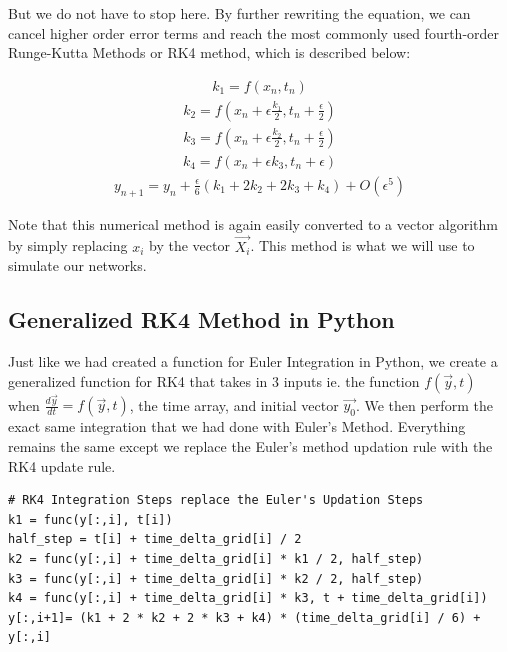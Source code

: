 \documentclass[10pt,letterpaper]{article}
\begin{document}
But we do not have to stop here. By further rewriting the equation, we can cancel higher order error terms and reach the most commonly used fourth-order Runge-Kutta Methods or RK4 method, which is described below:

\begin{eqnarray}k_1=f(x_n,t_n)\end{eqnarray}
\begin{eqnarray}k_2=f(x_n+\epsilon\frac{k_1}{2},t_n+\frac{\epsilon}{2})\end{eqnarray}
\begin{eqnarray}k_3=f(x_n+\epsilon\frac{k_2}{2},t_n+\frac{\epsilon}{2})\end{eqnarray}
\begin{eqnarray}k_4=f(x_n+\epsilon k_3,t_n+\epsilon)\end{eqnarray}
\begin{eqnarray}y_{n+1}=y_n+\frac{\epsilon}{6}(k_1+2 k_2+2 k_3+k_4)+O(\epsilon^5)\end{eqnarray}

Note that this numerical method is again easily converted to a vector algorithm by simply replacing $x_i$ by the vector $\vec{X_i}$. This method is what we will use to simulate our networks.


\subsection*{Generalized RK4 Method in Python}

Just like we had created a function for Euler Integration in Python, we create a generalized function for RK4 that takes in 3 inputs ie. the function $f(\vec{y},t)$ when $\frac{d\vec{y}}{dt}=f(\vec{y},t)$, the time array, and initial vector $\vec{y_0}$. We then perform the exact same integration that we had done with Euler's Method. Everything remains the same except we replace the Euler's method updation rule with the RK4 update rule.

\begin{verbatim}
# RK4 Integration Steps replace the Euler's Updation Steps
k1 = func(y[:,i], t[i])                               
half_step = t[i] + time_delta_grid[i] / 2
k2 = func(y[:,i] + time_delta_grid[i] * k1 / 2, half_step)
k3 = func(y[:,i] + time_delta_grid[i] * k2 / 2, half_step)
k4 = func(y[:,i] + time_delta_grid[i] * k3, t + time_delta_grid[i])
y[:,i+1]= (k1 + 2 * k2 + 2 * k3 + k4) * (time_delta_grid[i] / 6) + y[:,i]
\end{verbatim}
\end{document}

